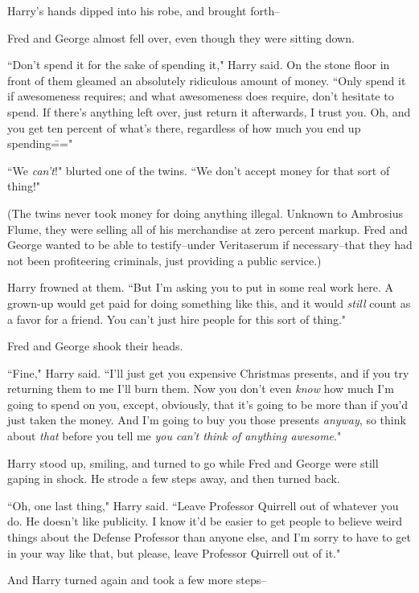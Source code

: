 Harry's hands dipped into his robe, and brought forth\---

Fred and George almost fell over, even though they were sitting down.

``Don't spend it for the sake of spending it," Harry said. On the stone floor in front of them gleamed an absolutely ridiculous amount of money. ``Only spend it if awesomeness requires; and what awesomeness does require, don't hesitate to spend. If there's anything left over, just return it afterwards, I trust you. Oh, and you get ten percent of what's there, regardless of how much you end up spending\==="

``We \emph{can't}!" blurted one of the twins. ``We don't accept money for that sort of thing!"

(The twins never took money for doing anything illegal. Unknown to Ambrosius Flume, they were selling all of his merchandise at zero percent markup. Fred and George wanted to be able to testify\---under Veritaserum if necessary\---that they had not been profiteering criminals, just providing a public service.)

Harry frowned at them. ``But I'm asking you to put in some real work here. A grown-up would get paid for doing something like this, and it would \emph{still} count as a favor for a friend. You can't just hire people for this sort of thing."

Fred and George shook their heads.

``Fine," Harry said. ``I'll just get you expensive Christmas presents, and if you try returning them to me I'll burn them. Now you don't even \emph{know} how much I'm going to spend on you, except, obviously, that it's going to be more than if you'd just taken the money. And I'm going to buy you those presents \emph{anyway}, so think about \emph{that} before you tell me \emph{you can't think of anything awesome}."

Harry stood up, smiling, and turned to go while Fred and George were still gaping in shock. He strode a few steps away, and then turned back.

``Oh, one last thing," Harry said. ``Leave Professor Quirrell out of whatever you do. He doesn't like publicity. I know it'd be easier to get people to believe weird things about the Defense Professor than anyone else, and I'm sorry to have to get in your way like that, but please, leave Professor Quirrell out of it."

And Harry turned again and took a few more steps\---

